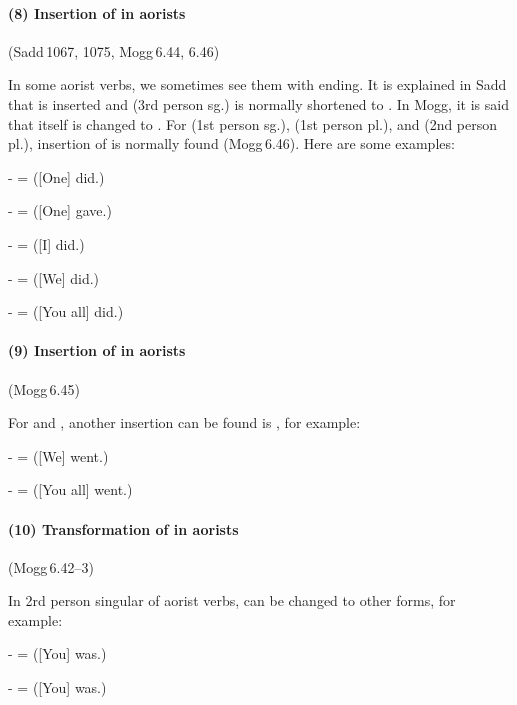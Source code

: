 \paragraph*{(8) Insertion of  in aorists} (Sadd\,1067, 1075, Mogg\,6.44, 6.46)\par
In some aorist verbs, we sometimes see them with  ending. It is explained in Sadd that  is inserted and  (3rd person sg.) is normally shortened to . In Mogg, it is said that  itself is changed to . For  (1st person sg.),  (1st person pl.), and  (2nd person pl.), insertion of  is normally found (Mogg\,6.46). Here are some examples:\par
-  =  ([One] did.)\par
-  =  ([One] gave.)\par
-  =  ([I] did.)\par
-  =  ([We] did.)\par
-  =  ([You all] did.)\par

\paragraph*{(9) Insertion of  in aorists} (Mogg\,6.45)\par
For  and , another insertion can be found is , for example:\par
-  =  ([We] went.)\par
-  =  ([You all] went.)\par

\paragraph*{(10) Transformation of  in aorists} (Mogg\,6.42--3)\par
In 2rd person singular of aorist verbs,  can be changed to other forms, for example:\par
-  =  ([You] was.)\par
-  =  ([You] was.)\par

